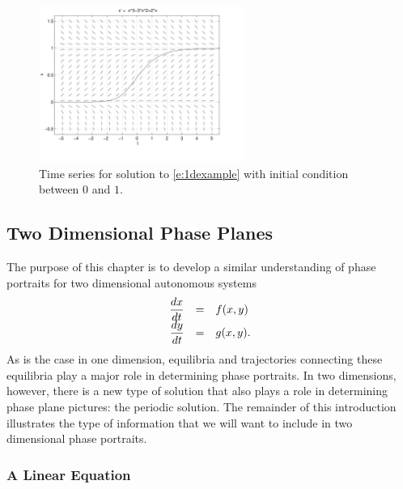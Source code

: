 \documentclass{ximera}
\begin{document}
\begin{figure}[htb]
           \centerline{%
            \includegraphics[height=2.0in]{../figures/pp1dt.pdf}}
           \caption{Time series for solution to \protect\eqref{e:1dexample}
	with initial condition between $0$ and $1$.}
           \label{F:pp1dt}
\end{figure}





\subsection*{Two Dimensional Phase Planes}

The purpose of this chapter is to develop a similar understanding 
of phase portraits for two dimensional autonomous systems
\arraystart
\begin{equation} \label{e:nonlinear2}
\begin{array}{rcl} 
\displaystyle\frac{dx}{dt} & = & f(x,y) \\
\displaystyle\frac{dy}{dt} & = & g(x,y).
\end{array}
\end{equation}
As is the case in one dimension, equilibria and trajectories 
connecting these equilibria play a major role in determining  
phase portraits.  In two dimensions, however, there is a new 
type of solution that also plays a role in determining phase 
plane pictures: the periodic solution.  
The remainder of this 
introduction illustrates the type of information that we will 
want to include in two dimensional phase portraits. 

\subsubsection*{A Linear Equation}
\end{document}
